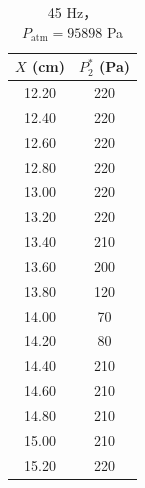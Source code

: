 \begin{table}[H]
  \centering
  \caption[45 Hz 尾迹扫描数据]{45 Hz，$P_{\text{atm}}=95898$ Pa}
  \label{tab:exp6_45_Hz}
  \renewcommand{\arraystretch}{1.2}
  \begin{tabular}{cc}
    \toprule
    $X$ (cm) & $P_2^*$ (Pa) \\
    \midrule
    12.20 & 220 \\
    12.40 & 220 \\
    12.60 & 220 \\
    12.80 & 220 \\
    13.00 & 220 \\
    13.20 & 220 \\
    13.40 & 210 \\
    13.60 & 200 \\
    13.80 & 120 \\
    14.00 & 70 \\
    14.20 & 80 \\
    14.40 & 210 \\
    14.60 & 210 \\
    14.80 & 210 \\
    15.00 & 210 \\
    15.20 & 220 \\
    \bottomrule
  \end{tabular}
\end{table}